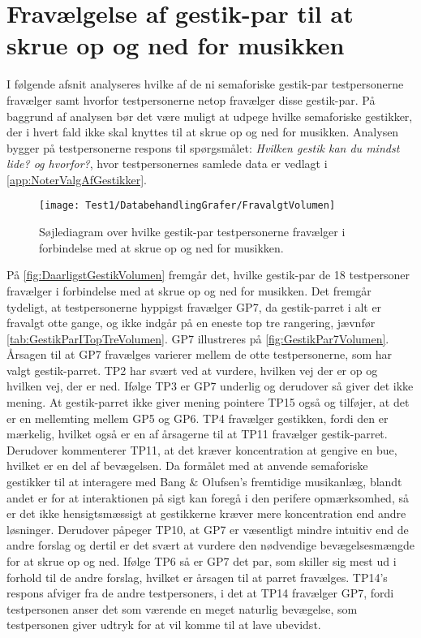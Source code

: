 \section{Fravælgelse af gestik-par til at skrue op og ned for musikken}
\label{app:TestresultaterVolumenDaarlig}
%
I følgende afsnit analyseres hvilke af de ni semaforiske gestik-par testpersonerne fravælger samt hvorfor testpersonerne netop fravælger disse gestik-par. På baggrund af analysen bør det være muligt at udpege hvilke semaforiske gestikker, der i hvert fald ikke skal knyttes til at skrue op og ned for musikken. Analysen bygger på testpersonerne respons til spørgsmålet: \textit{Hvilken gestik kan du mindst lide? og hvorfor?}, hvor testpersonernes samlede data er vedlagt i \autoref{app:NoterValgAfGestikker}.
%
\begin{figure}[H]
	\centering
	\texttt{[image: Test1/DatabehandlingGrafer/FravalgtVolumen]}
	\caption{Søjlediagram over hvilke gestik-par testpersonerne fravælger i forbindelse med at skrue op og ned for musikken.}
	\label{fig:DaarligstGestikVolumen}
\end{figure}
\noindent
%
På \autoref{fig:DaarligstGestikVolumen} fremgår det, hvilke gestik-par de 18 testpersoner fravælger i forbindelse med at skrue op og ned for musikken. Det fremgår tydeligt, at testpersonerne hyppigst fravælger GP7, da gestik-parret i alt er fravalgt otte gange, og ikke indgår på en eneste top tre rangering, jævnfør \autoref{tab:GestikParITopTreVolumen}. GP7 illustreres på \autoref{fig:GestikPar7Volumen}. Årsagen til at GP7 fravælges varierer mellem de otte testpersonerne, som har valgt gestik-parret. TP2 har svært ved at vurdere, hvilken vej der er op og hvilken vej, der er ned. Ifølge TP3 er GP7 underlig og derudover så giver det ikke mening. At gestik-parret ikke giver mening pointere TP15 også og tilføjer, at det er en mellemting mellem GP5 og GP6. TP4 fravælger gestikken, fordi den er mærkelig, hvilket også er en af årsagerne til at TP11 fravælger gestik-parret. Derudover kommenterer TP11, at det kræver koncentration at gengive en bue, hvilket er en del af bevægelsen. Da formålet med at anvende semaforiske gestikker til at interagere med Bang $\&$ Olufsen's fremtidige musikanlæg, blandt andet er for at interaktionen på sigt kan foregå i den perifere opmærksomhed, så er det ikke hensigtsmæssigt at gestikkerne kræver mere koncentration end andre løsninger. Derudover påpeger TP10, at GP7 er væsentligt mindre intuitiv end de andre forslag og dertil er det svært at vurdere den nødvendige bevægelsesmængde for at skrue op og ned. Ifølge TP6 så er GP7 det par, som skiller sig mest ud i forhold til de andre forslag, hvilket er årsagen til at parret fravælges. TP14's respons afviger fra de andre testpersoners, i det at TP14 fravælger GP7, fordi testpersonen anser det som værende en meget naturlig bevægelse, som testpersonen giver udtryk for at vil komme til at lave ubevidst.
